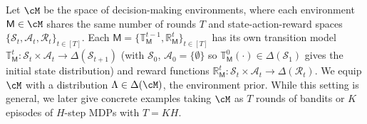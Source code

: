 \documentclass[10pt]{article}
\newcommand{\<}{\left\langle}
\renewcommand{\>}{\right\rangle}
\newcommand{\inst}{{\mathsf{M}}}
\newcommand{\transmodel}{{\mathbb T}}
\newcommand{\rewmodel}{{\mathbb R}}
\newcommand{\totlen}{{T}} %
\newcommand{\prior}{{\Lambda}}
\newcommand{\statesp}{{\mathcal{S}}}
\newcommand{\actionsp}{{\mathcal{A}}}
\newcommand{\rewardsp}{{\mathcal{R}}}
\begin{document}
Let $\cM$ be the space of decision-making environments, where each environment $\inst \in \cM$ shares the same number of rounds $\totlen$ and state-action-reward spaces $\{ \statesp_t,  \actionsp_t, \rewardsp_t \}_{t \in [\totlen]}$. Each $\inst = \{\transmodel_\inst^{t-1}, \rewmodel_\inst^t \}_{t \in [\totlen]}$ has its own transition model $\transmodel_\inst^t: \statesp_{t} \times \actionsp_{t} \to \Delta(\statesp_{t+1})$ (with $\statesp_0$, $\actionsp_0 = \{ \emptyset \}$ so $\transmodel_\inst^0(\cdot) \in \Delta(\statesp_1)$ gives the initial state distribution) and reward functions $\rewmodel_\inst^{t}: \statesp_{t} \times \actionsp_{t} \to \Delta(\rewardsp_t)$. We equip $\cM$ with a distribution $\prior \in \Delta(\cM)$, the environment prior. While this setting is general, we later give concrete examples taking $\cM$ as $\totlen$ rounds of bandits or $K$ episodes of $H$-step MDPs with $\totlen = K H$. 
\end{document}
